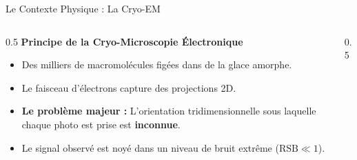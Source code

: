 \begin{frame}{Le Contexte Physique : La Cryo-EM}
    \begin{columns}[c]
        \begin{column}{0.5\textwidth}
            \large\textbf{Principe de la Cryo-Microscopie Électronique}\\[0.3cm]
            \normalsize
            \begin{itemize}
                \item Des milliers de macromolécules figées dans de la glace amorphe.
                \item Le faisceau d'électrons capture des \alert{projections 2D}.
                \item \textbf{Le problème majeur :} L'orientation tridimensionnelle sous laquelle chaque photo est prise est \textbf{inconnue}.
                \item Le signal observé est noyé dans un niveau de bruit extrême ($\text{RSB} \ll 1$).
            \end{itemize}
        \end{column}
        \begin{column}{0.5\textwidth}
            \centering
        \end{column}
    \end{columns}
\end{frame}